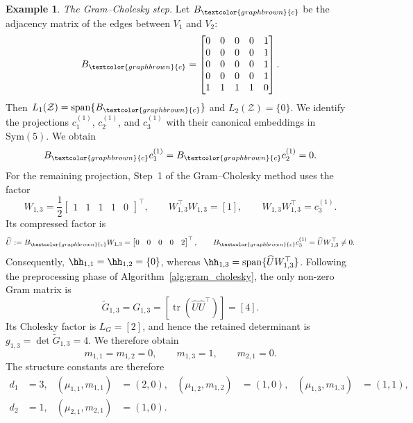 \documentclass[12pt]{amsart}
\theoremstyle{plain}
\theoremstyle{definition}
\newtheorem{example}[theorem]{Example}
\theoremstyle{remark}
\newcommand{\1}{\mathbf{1}}
\newcommand{\tr}{\operatorname{tr}}
\begin{document}
\begin{example}
\noindent\emph{The Gram--Cholesky step.}
Let $B_{\textcolor{graphbrown}{c}}$ be the adjacency matrix of the edges between $V_1$ and $V_2$:
\begin{equation}\label{eq:worked-example-cross-block-basis}
B_{\textcolor{graphbrown}{c}}=
\begin{bmatrix}
0&0&0&0&1\\
0&0&0&0&1\\
0&0&0&0&1\\
0&0&0&0&1\\
1&1&1&1&0
\end{bmatrix}.
\end{equation}
Then $L_1(\mathcal Z)=\mathrm{span}\{B_{\textcolor{graphbrown}{c}}\}$ and $L_2(\mathcal Z)=\{0\}$. We identify the projections $c_1^{(1)}$, $c_2^{(1)}$, and $c_3^{(1)}$ with their canonical embeddings in $\mathrm{Sym}(5)$. We obtain
\[
B_{\textcolor{graphbrown}{c}}c_1^{(1)}=B_{\textcolor{graphbrown}{c}}c_2^{(1)}=0.
\]
For the remaining projection, Step~1 of the Gram--Cholesky method uses
the factor
\[
W_{1,3}=\frac12
\begin{bmatrix}1&1&1&1&0\end{bmatrix}^{\top},
\qquad
W_{1,3}^{\top}W_{1,3}=[1],
\qquad
W_{1,3}W_{1,3}^{\top}=c_3^{(1)}.
\]
Its compressed factor is
\[
\widehat U
:=B_{\textcolor{graphbrown}{c}}W_{1,3}
=\begin{bmatrix}0&0&0&0&2\end{bmatrix}^{\top},
\qquad
B_{\textcolor{graphbrown}{c}}c_3^{(1)}
=\widehat U W_{1,3}^{\top}\ne0.
\]
Consequently, $\hh_{1,1}=\hh_{1,2}=\{0\}$, whereas
$\hh_{1,3}=\mathrm{span}\{\widehat U W_{1,3}^{\top}\}$.
Following the preprocessing phase of Algorithm~\ref{alg:gram_cholesky},
the only non-zero Gram matrix is
\[
\widetilde G_{1,3}=G_{1,3}
=[\tr(\widehat U\widehat U^\top)]=[4].
\]
Its Cholesky factor is $L_G=[2]$, and hence the retained determinant is
$g_{1,3}=\det\widetilde G_{1,3}=4$. We therefore obtain
\[
m_{1,1}=m_{1,2}=0,\qquad m_{1,3}=1,\qquad m_{2,1}=0.
\]
The structure constants are therefore
\begin{equation}\label{eq:worked-example-structure-constants}
\begin{aligned}
d_1&=3,& (\mu_{1,1},m_{1,1})&=(2,0),&
(\mu_{1,2},m_{1,2})&=(1,0),&
(\mu_{1,3},m_{1,3})&=(1,1),\\
d_2&=1,& (\mu_{2,1},m_{2,1})&=(1,0).&&&&
\end{aligned}
\end{equation}



\end{example}
\end{document}
